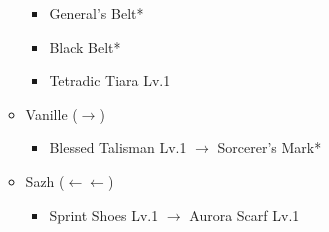 \begin{menu}
\begin{itemize}
\begin{itemize}
\begin{itemize}
					\item General's Belt*
					\item Black Belt*
					\item Tetradic Tiara Lv.1
				\end{itemize}
			\item Vanille ($\rightarrow$)
				\begin{itemize}
					\item Blessed Talisman Lv.1 $\rightarrow$ Sorcerer's Mark*
				\end{itemize}
			\item Sazh ($\leftarrow\leftarrow$)
				\begin{itemize}
					\item Sprint Shoes Lv.1 $\rightarrow$ Aurora Scarf Lv.1
				\end{itemize}
		\end{itemize}
	\end{itemize}
\end{menu}

\renewcommand{\first}{[1] Mystic Tower (\rav/\sen/\rav)}
\renewcommand{\third}{[3] Protection (\syn/\sen/\med)}
\renewcommand{\sixth}{[6] Entourage (\rav/\sen/\med)}

